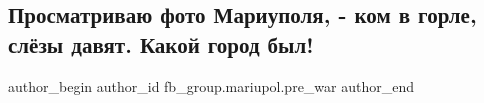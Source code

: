  
 
 
 
 

\subsection{Просматриваю фото Мариуполя, - ком в горле, слёзы давят. Какой город был!}
\label{sec:25_02_2023.fb.fb_group.mariupol.pre_war.3.prosmatrivayu_foto_m}

\ifcmt
 author_begin
   author_id fb_group.mariupol.pre_war
 author_end
\fi
